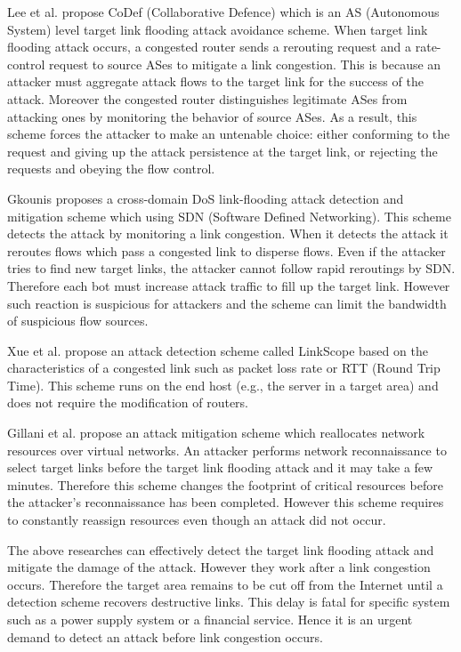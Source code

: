 \documentclass[conference]{IEEEtran}
\begin{document}
    Lee et al. \cite{CoDef} propose CoDef (Collaborative Defence) which is an AS (Autonomous System) level target link flooding attack avoidance scheme.
    When target link flooding attack occurs, a congested router sends a rerouting request and a rate-control request to source ASes to mitigate a link congestion.
    This is because an attacker must aggregate attack flows to the target link for the success of the attack.
    Moreover the congested router distinguishes legitimate ASes from attacking ones by monitoring the behavior of source ASes.
    As a result, this scheme forces the attacker to make an untenable choice: either conforming to the request and giving up the attack persistence at the target link, or rejecting the requests and obeying the flow control.

    Gkounis \cite{crossdomain} proposes a cross-domain DoS link-flooding attack detection and mitigation scheme which using SDN (Software Defined Networking).
    This scheme detects the attack by monitoring a link congestion.
    When it detects the attack it reroutes flows which pass a congested link to disperse flows.
    Even if the attacker tries to find new target links, the attacker cannot follow rapid reroutings by SDN.
    Therefore each bot must increase attack traffic to fill up the target link.
    However such reaction is suspicious for attackers and the scheme can limit the bandwidth of suspicious flow sources.

    Xue et al. \cite{DetectTLFA} propose an attack detection scheme called LinkScope based on the characteristics of a congested link such as packet loss rate or RTT (Round Trip Time).
    This scheme runs on the end host (e.g., the server in a target area) and does not require the modification of routers.

    Gillani et al. \cite{agile} propose an attack mitigation scheme which reallocates network resources over virtual networks.
    An attacker performs network reconnaissance to select target links before the target link flooding attack and it may take a few minutes.
    Therefore this scheme changes the footprint of critical resources before the attacker's reconnaissance has been completed.
    However this scheme requires to constantly reassign resources even though an attack did not occur.

    The above researches \cite{CoDef,crossdomain,DetectTLFA} can effectively detect the target link flooding attack and mitigate the damage of the attack.
    However they work after a link congestion occurs.
    Therefore the target area remains to be cut off from the Internet until a detection scheme recovers destructive links.
    This delay is fatal for specific system such as a power supply system or a financial service.
    Hence it is an urgent demand to detect an attack before link congestion occurs.
\end{document}

